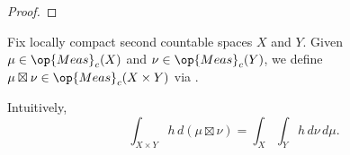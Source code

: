 \documentclass[../notes.tex]{subfiles}
\begin{document}
\begin{proof}
\end{proof}
\begin{notation}
	Fix locally compact second countable spaces $X$ and $Y$. Given $\mu\in\op{Meas}_c(X)$ and $\nu\in\op{Meas}_c(Y)$, we define $\mu\boxtimes\nu\in\op{Meas}_c(X\times Y)$ via .
\end{notation}
Intuitively,
\[\int_{X\times Y}h\,d(\mu\boxtimes\nu)=\int_X\int_Yh\,d\nu\,d\mu.\]
\end{document}

